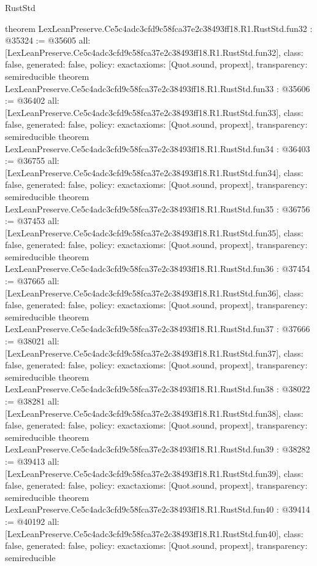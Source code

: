 \begin{lexlean}{RustStd}
\begin{coremodule}
{}
theorem LexLeanPreserve.Ce5c4adc3cfd9c58fca37e2c38493ff18.R1.RustStd.fun32 : @35324 := @35605 {
  all: [LexLeanPreserve.Ce5c4adc3cfd9c58fca37e2c38493ff18.R1.RustStd.fun32],
  class: false,
  generated: false,
  policy: exact{axioms: [Quot.sound, propext]},
  transparency: semireducible
}
theorem LexLeanPreserve.Ce5c4adc3cfd9c58fca37e2c38493ff18.R1.RustStd.fun33 : @35606 := @36402 {
  all: [LexLeanPreserve.Ce5c4adc3cfd9c58fca37e2c38493ff18.R1.RustStd.fun33],
  class: false,
  generated: false,
  policy: exact{axioms: [Quot.sound, propext]},
  transparency: semireducible
}
theorem LexLeanPreserve.Ce5c4adc3cfd9c58fca37e2c38493ff18.R1.RustStd.fun34 : @36403 := @36755 {
  all: [LexLeanPreserve.Ce5c4adc3cfd9c58fca37e2c38493ff18.R1.RustStd.fun34],
  class: false,
  generated: false,
  policy: exact{axioms: [Quot.sound, propext]},
  transparency: semireducible
}
theorem LexLeanPreserve.Ce5c4adc3cfd9c58fca37e2c38493ff18.R1.RustStd.fun35 : @36756 := @37453 {
  all: [LexLeanPreserve.Ce5c4adc3cfd9c58fca37e2c38493ff18.R1.RustStd.fun35],
  class: false,
  generated: false,
  policy: exact{axioms: [Quot.sound, propext]},
  transparency: semireducible
}
theorem LexLeanPreserve.Ce5c4adc3cfd9c58fca37e2c38493ff18.R1.RustStd.fun36 : @37454 := @37665 {
  all: [LexLeanPreserve.Ce5c4adc3cfd9c58fca37e2c38493ff18.R1.RustStd.fun36],
  class: false,
  generated: false,
  policy: exact{axioms: [Quot.sound, propext]},
  transparency: semireducible
}
theorem LexLeanPreserve.Ce5c4adc3cfd9c58fca37e2c38493ff18.R1.RustStd.fun37 : @37666 := @38021 {
  all: [LexLeanPreserve.Ce5c4adc3cfd9c58fca37e2c38493ff18.R1.RustStd.fun37],
  class: false,
  generated: false,
  policy: exact{axioms: [Quot.sound, propext]},
  transparency: semireducible
}
theorem LexLeanPreserve.Ce5c4adc3cfd9c58fca37e2c38493ff18.R1.RustStd.fun38 : @38022 := @38281 {
  all: [LexLeanPreserve.Ce5c4adc3cfd9c58fca37e2c38493ff18.R1.RustStd.fun38],
  class: false,
  generated: false,
  policy: exact{axioms: [Quot.sound, propext]},
  transparency: semireducible
}
theorem LexLeanPreserve.Ce5c4adc3cfd9c58fca37e2c38493ff18.R1.RustStd.fun39 : @38282 := @39413 {
  all: [LexLeanPreserve.Ce5c4adc3cfd9c58fca37e2c38493ff18.R1.RustStd.fun39],
  class: false,
  generated: false,
  policy: exact{axioms: [Quot.sound, propext]},
  transparency: semireducible
}
theorem LexLeanPreserve.Ce5c4adc3cfd9c58fca37e2c38493ff18.R1.RustStd.fun40 : @39414 := @40192 {
  all: [LexLeanPreserve.Ce5c4adc3cfd9c58fca37e2c38493ff18.R1.RustStd.fun40],
  class: false,
  generated: false,
  policy: exact{axioms: [Quot.sound, propext]},
  transparency: semireducible
}
\end{coremodule}
\end{lexlean}
